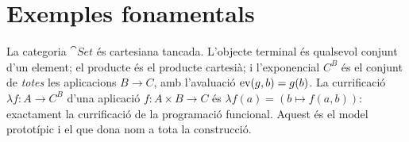 \section{Exemples fonamentals}

\begin{exemple}
La categoria $\cat{Set}$ és cartesiana tancada. L'objecte terminal és qualsevol conjunt d'un element; el producte és el producte cartesià; i l'exponencial $C^{B}$ és el conjunt de \emph{totes} les aplicacions $B\to C$, amb l'avaluació $\operatorname{ev}(g,b)=g(b)$. La currificació $\lambda f\colon A\to C^{B}$ d'una aplicació $f\colon A\times B\to C$ és $\lambda f(a)=(b\mapsto f(a,b))$: exactament la currificació de la programació funcional. Aquest és el model prototípic i el que dona nom a tota la construcció.
\end{exemple}

